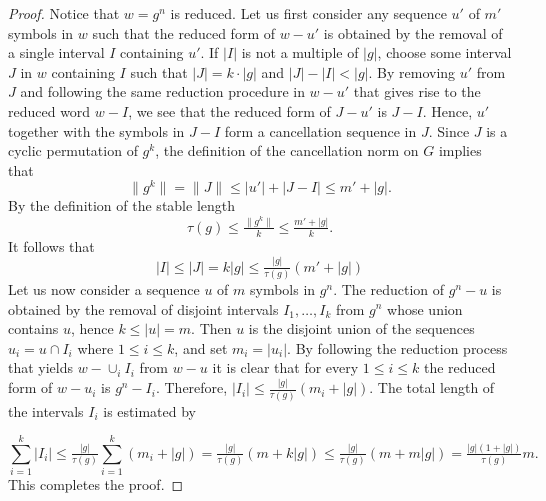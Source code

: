 \documentclass[12pt]{amsart}
\theoremstyle{definition}
\begin{document}
\begin{proof}
Notice that $w=g^n$ is reduced.
Let us first consider any sequence $u'$ of $m'$ symbols in $w$ such that the reduced form of $w-u'$ is obtained by the removal of a single interval $I$ containing $u'$.
If $|I|$ is not a multiple of $|g|$, choose some interval $J$ in $w$ containing $I$ such that $|J|=k \cdot |g|$ and $|J|-|I|<|g|$.
By removing $u'$ from $J$ and following the same reduction procedure in $w - u'$ that gives rise to the reduced word $w - I$, we see that the reduced form of $J-u'$ is $J -I$.
Hence, $u'$ together with the symbols in $J-I$ form a cancellation sequence in $J$.
Since $J$ is a cyclic permutation of $g^k$, the definition of the cancellation norm on $G$ implies that
\[
\|g^k\| =\|J\| \leq |u'|+|J-I| \leq m'+|g|.
\]
By the definition of the stable length
\[
\tau(g) \leq \tfrac{\| g^k\|}{k} \leq \tfrac{m'+|g|}{k}.
\]
It follows that 
\[
|I| \leq |J|= k |g| \leq \tfrac{|g|}{\tau(g)} (m'+|g|)
\]
Let us now consider a sequence $u$ of $m$ symbols in $g^n$.
The reduction of $g^n-u$ is obtained by the removal of disjoint intervals $I_1,\dots, I_k$ from $g^n$ whose union contains $u$, hence $k \leq |u| =m$.
Then $u$ is the disjoint union of the sequences $u_i=u \cap I_i$ where $1 \leq i \leq k$, and set $m_i=|u_i|$.
By following the reduction process that yields $w-\cup_i I_i$ from $w-u$ it is clear that for every $1 \leq i \leq k$ the reduced form of  $w-u_i$ is $g^n-I_i$. 
Therefore,  $|I_i| \leq \tfrac{|g|}{\tau(g)} (m_i+|g|)$.
The total length of the intervals $I_i$ is estimated by 

\[
\sum_{i=1}^k |I_i| 
\leq \tfrac{|g|}{\tau(g)} \sum_{i=1}^k (m_i+|g|) 
=
\tfrac{|g|}{\tau(g)} (m+ k|g|) 
\leq \tfrac{|g|}{\tau(g)}(m+m|g|) 
= 
\tfrac{|g|(1+|g|)}{\tau(g)}m.
\]
This completes the proof.
\end{proof}
\end{document}
